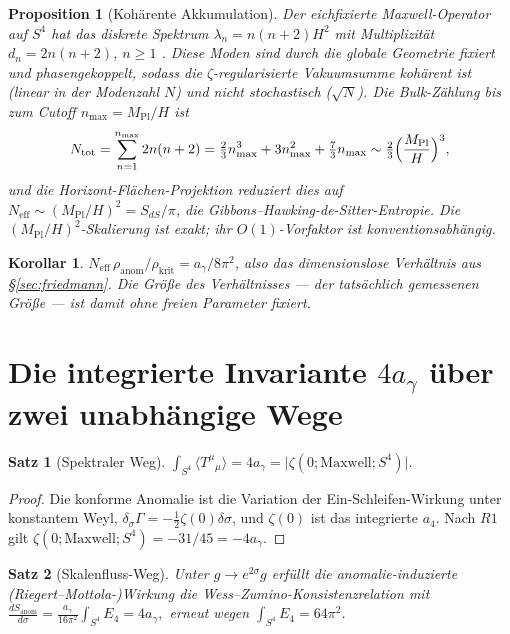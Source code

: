 \documentclass[11pt,a4paper]{article}
\newtheorem{theorem}{Satz}
\newtheorem{proposition}{Proposition}
\newtheorem{corollary}{Korollar}
\theoremstyle{definition}
\theoremstyle{remark}
\newcommand{\ag}{a_\gamma}
\newcommand{\Mpl}{M_{\mathrm{Pl}}}
\newcommand{\avg}[1]{\langle #1\rangle}
\begin{document}
\begin{proposition}[Kohärente Akkumulation]\label{prop:lift}
Der eichfixierte Maxwell-Operator auf $S^4$ hat das diskrete Spektrum $\lambda_n=n(n+2)H^2$ mit
Multiplizität $d_n=2n(n+2)$, $n\ge1$ \cite{Allen,Higuchi}. Diese Moden sind durch die globale
Geometrie fixiert und phasengekoppelt, sodass die $\zeta$-regularisierte Vakuumsumme \emph{kohärent}
ist (linear in der Modenzahl $N$) und nicht stochastisch ($\sqrt N$). Die Bulk-Zählung bis zum Cutoff
$n_{\max}=\Mpl/H$ ist
\[
N_{\mathrm{tot}}=\sum_{n=1}^{n_{\max}}2n(n+2)=\tfrac23 n_{\max}^3+3n_{\max}^2+\tfrac73 n_{\max}
\sim\tfrac23\Bigl(\frac{\Mpl}{H}\Bigr)^3,
\]
und die Horizont-Flächen-Projektion reduziert dies auf
$N_{\mathrm{eff}}\sim(\Mpl/H)^2=S_{dS}/\pi$, die Gibbons--Hawking-de-Sitter-Entropie. Die
$(\Mpl/H)^2$-Skalierung ist exakt; ihr $O(1)$-Vorfaktor ist konventionsabhängig.
\end{proposition}

\begin{corollary}
$N_{\mathrm{eff}}\,\rho_{\mathrm{anom}}/\rho_{\mathrm{krit}}=\ag/8\pi^2$, also das dimensionslose
Verhältnis aus \S\ref{sec:friedmann}. Die Größe des \emph{Verhältnisses} --- der tatsächlich
gemessenen Größe --- ist damit ohne freien Parameter fixiert.
\end{corollary}

\section{Die integrierte Invariante $4\ag$ über zwei unabhängige Wege}\label{sec:invariant}
\begin{theorem}[Spektraler Weg]\label{thm:zeta}
$\displaystyle\int_{S^4}\avg{T^\mu{}_\mu}=4\ag=\bigl\lvert\zeta(0;\mathrm{Maxwell};S^4)\bigr\rvert.$
\end{theorem}
\begin{proof}
Die konforme Anomalie ist die Variation der Ein-Schleifen-Wirkung unter konstantem Weyl,
$\delta_\sigma\Gamma=-\tfrac12\zeta(0)\delta\sigma$, und $\zeta(0)$ ist das integrierte $a_4$. Nach
$R1$ gilt $\zeta(0;\mathrm{Maxwell};S^4)=-31/45=-4\ag$.
\end{proof}

\begin{theorem}[Skalenfluss-Weg]\label{thm:scaleflow}
Unter $g\to e^{2\sigma}g$ erfüllt die anomalie-induzierte (Riegert--Mottola-)Wirkung die
Wess--Zumino-Konsistenzrelation mit
$\displaystyle\frac{dS_{\mathrm{anom}}}{d\sigma}=\frac{\ag}{16\pi^2}\int_{S^4}E_4=4\ag,$
erneut wegen $\int_{S^4}E_4=64\pi^2$. \cite{Riegert1984,Mottola}
\end{theorem}
\end{document}
